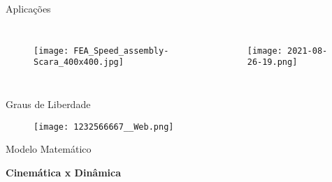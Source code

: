 \begin{frame}[c]{Aplicações}

    \begin{columns}
        \begin{figure}
            \texttt{[image: FEA\_Speed\_assembly-Scara\_400x400.jpg]}
        \end{figure}    

        \begin{figure}
            \texttt{[image: 2021-08-26-19.png]}
        \end{figure}   
    \end{columns}
\end{frame}
\begin{frame}{Graus de Liberdade}
    \begin{figure}
        \texttt{[image: 1232566667\_\_Web.png]}
    \end{figure}     
\end{frame}
\begin{frame}[c]{Modelo Matemático} 

    \begin{center}
        \vspace*{1.5cm}
        \textbf{\Huge{Cinemática x Dinâmica}}
    \end{center}
        
\end{frame}
